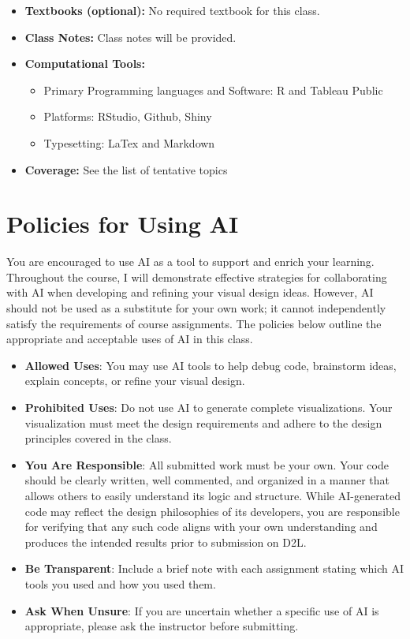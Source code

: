 \documentclass[
]{article}
\providecommand{\tightlist}{%
  \setlength{\itemsep}{0pt}\setlength{\parskip}{0pt}}
\begin{document}
\begin{itemize}
\item
  \textbf{Textbooks (optional):} No required textbook for this class.
\item
  \textbf{Class Notes:} Class notes will be provided.
\item
  \textbf{Computational Tools:}

  \begin{itemize}
  \tightlist
  \item
    Primary Programming languages and Software: R and Tableau Public
  \item
    Platforms: RStudio, Github, Shiny
  \item
    Typesetting: LaTex and Markdown
  \end{itemize}
\item
  \textbf{Coverage:} See the list of tentative topics
\end{itemize}

\hypertarget{policies-for-using-ai}{%
\section{Policies for Using AI}\label{policies-for-using-ai}}

You are encouraged to use AI as a tool to support and enrich your
learning. Throughout the course, I will demonstrate effective strategies
for collaborating with AI when developing and refining your visual
design ideas. However, AI should not be used as a substitute for your
own work; it cannot independently satisfy the requirements of course
assignments. The policies below outline the appropriate and acceptable
uses of AI in this class.

\begin{itemize}
\item
  \textbf{Allowed Uses}: You may use AI tools to help debug code,
  brainstorm ideas, explain concepts, or refine your visual design.
\item
  \textbf{Prohibited Uses}: Do not use AI to generate complete
  visualizations. Your visualization must meet the design requirements
  and adhere to the design principles covered in the class.
\item
  \textbf{You Are Responsible}: All submitted work must be your own.
  Your code should be clearly written, well commented, and organized in
  a manner that allows others to easily understand its logic and
  structure. While AI-generated code may reflect the design philosophies
  of its developers, you are responsible for verifying that any such
  code aligns with your own understanding and produces the intended
  results prior to submission on D2L.
\item
  \textbf{Be Transparent}: Include a brief note with each assignment
  stating which AI tools you used and how you used them.
\item
  \textbf{Ask When Unsure}: If you are uncertain whether a specific use
  of AI is appropriate, please ask the instructor before submitting.
\end{itemize}
\end{document}
